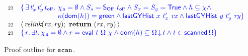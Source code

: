 \begin{figure}[t]
\[\begin{array}[t]{r l}
   \num{21} & \specK{\{\, \exists\, t'_x\, t'_y\, \toff \ldot\,
              \histS = \hempty \wedge
              \sss = \sOff\ \toff \wedge \sx = \sy = \TT \wedge
              h \subseteq \hist \wedge}\\
             & \specK{\hphantom{\{\,
                  \exists\, t'_x\, t'_y\, \toff \ldot}\,
              \C(\dom{h}) = \mathsf{green} \wedge
              \histLGY\ x\ t'_x\ \var{rx} \wedge
              \histLGY\ y\ t'_y\ \var{ry}\}}\\
  \num{22} & \lat\,\aux{relink}(\var{rx}, \var{ry});\
                \kw{return}\ (\var{rx}, \var{ry})\,\rat \\
  \num{23} & \specK{\{\, r\ldot \exists t\ldot \histS = \hempty \wedge
    r = \eval\ t\ {\stableorder}\ {\hist} \wedge
    \dom{h} \subseteq \ideal{\stableorder}{t} \wedge
    t \in \scanned{\stableorder}\}}
\end{array}
\]
  \caption{\label{proof:scan} Proof outline for $\texttt{scan}$.}
\end{figure}
